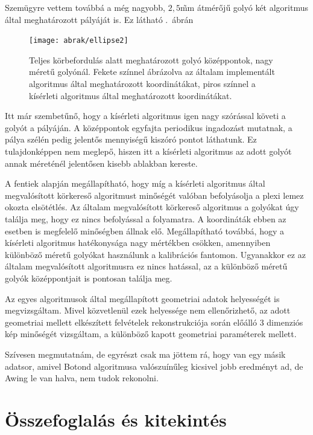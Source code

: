\documentclass[a4paper,12pt]{article}
\begin{document}
Szemügyre vettem továbbá a  még nagyobb, $2,\!5$\~mm átmérőjű golyó két algoritmus által meghatározott pályáját is. Ez látható  .~ábrán




\begin{figure}[htbp]
\center
\texttt{[image: abrak/ellipse2]}
\caption{Teljes körbefordulás alatt meghatározott golyó középpontok, nagy méretű golyónál. Fekete színnel ábrázolva az általam implementált algoritmus által meghatározott koordinátákat, piros színnel a kísérleti algoritmus által meghatározott koordinátákat.}
\label{fig:ellipses2}
\end{figure}



Itt már szembetűnő, hogy a kísérleti algoritmus igen nagy szórással követi a  golyót a pályáján. A középpontok egyfajta periodikus ingadozást mutatnak, a pálya szélén pedig jelentős mennyiségű kiszóró pontot láthatunk. Ez tulajdonképpen nem meglepő, hiszen itt a kísérleti algoritmus az adott golyót annak méreténél jelentősen kisebb ablakban kereste. 


A fentiek alapján megállapítható, hogy míg a kísérleti algoritmus által megvalósított körkereső algoritmust minőségét valóban befolyásolja a plexi lemez okozta elsötétlés. Az általam megvalósított körkereső algoritmus a golyókat úgy találja meg, hogy ez nincs befolyással a folyamatra. A koordináták ebben az esetben is megfelelő minőségben állnak elő. Megállapítható továbbá, hogy a kísérleti algoritmus hatékonysága nagy mértékben csökken, amennyiben különböző méretű golyókat használunk a kalibrációs fantomon. Ugyanakkor ez az általam megvalósított algoritmusra ez nincs hatással, az a különböző méretű golyók középpontjait is pontosan találja meg.



Az egyes algoritmusok által megállapított geometriai adatok helyességét is megvizsgáltam. Mivel közvetlenül ezek helyessége nem ellenőrizhető, az adott geometriai mellett elkészített felvételek rekonstrukciója során előálló 3 dimenziós kép minőségét vizsgáltam, a különböző kapott geometriai paraméterek mellett. 


{ \Huge Szívesen megmutatnám, de egyrészt csak ma jöttem rá, hogy van egy másik adatsor, amivel Botond algoritmusa valószuínűleg kicsivel jobb eredményt ad, de Awing le van halva, nem tudok rekonolni.}


\section{Összefoglalás és kitekintés}
\end{document}
